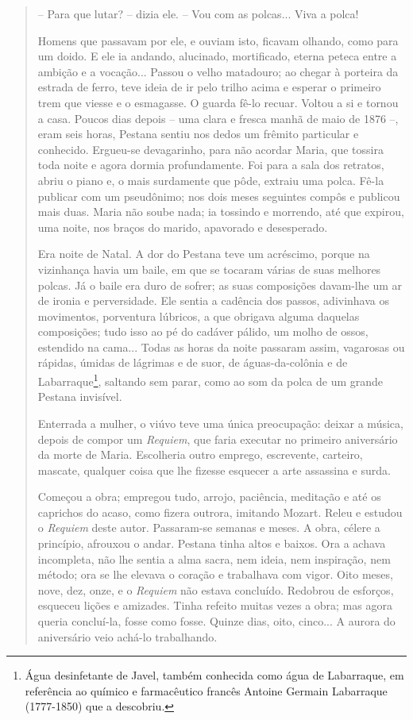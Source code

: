 \begin{quote}
-- Para que lutar? -- dizia ele. -- Vou com as polcas... Viva a polca!

Homens que passavam por ele, e ouviam isto, ficavam olhando, como para
um doido. E ele ia andando, alucinado, mortificado, eterna peteca entre
a ambição e a vocação... Passou o velho matadouro; ao chegar à porteira
da estrada de ferro, teve ideia de ir pelo trilho acima e esperar o
primeiro trem que viesse e o esmagasse. O guarda fê-lo recuar. Voltou a
si e tornou a casa. Poucos dias depois -- uma clara e fresca manhã de
maio de 1876 --, eram seis horas, Pestana sentiu nos dedos um frêmito
particular e conhecido. Ergueu-se devagarinho, para não acordar Maria,
que tossira toda noite e agora dormia profundamente. Foi para a sala dos
retratos, abriu o piano e, o mais surdamente que pôde, extraiu uma
polca. Fê-la publicar com um pseudônimo; nos dois meses seguintes compôs
e publicou mais duas. Maria não soube nada; ia tossindo e morrendo, até
que expirou, uma noite, nos braços do marido, apavorado e desesperado.

Era noite de Natal. A dor do Pestana teve um acréscimo, porque na
vizinhança havia um baile, em que se tocaram várias de suas melhores
polcas. Já o baile era duro de sofrer; as suas composições davam-lhe um
ar de ironia e perversidade. Ele sentia a cadência dos passos,
adivinhava os movimentos, porventura lúbricos, a que obrigava alguma
daquelas composições; tudo isso ao pé do cadáver pálido, um molho de
ossos, estendido na cama... Todas as horas da noite passaram assim,
vagarosas ou rápidas, úmidas de lágrimas e de suor, de águas-da-colônia
e de Labarraque\footnote{Água desinfetante de Javel, também conhecida
  como água de Labarraque, em referência ao químico e farmacêutico
  francês Antoine Germain Labarraque (1777-1850) que a descobriu.},
saltando sem parar, como ao som da polca de um grande Pestana invisível.

Enterrada a mulher, o viúvo teve uma única preocupação: deixar a música,
depois de compor um \emph{Requiem}, que faria executar no primeiro
aniversário da morte de Maria. Escolheria outro emprego, escrevente,
carteiro, mascate, qualquer coisa que lhe fizesse esquecer a arte
assassina e surda.

Começou a obra; empregou tudo, arrojo, paciência, meditação e até os
caprichos do acaso, como fizera outrora, imitando Mozart. Releu e
estudou o \emph{Requiem} deste autor. Passaram-se semanas e meses. A
obra, célere a princípio, afrouxou o andar. Pestana tinha altos e
baixos. Ora a achava incompleta, não lhe sentia a alma sacra, nem ideia,
nem inspiração, nem método; ora se lhe elevava o coração e trabalhava
com vigor. Oito meses, nove, dez, onze, e o \emph{Requiem} não estava
concluído. Redobrou de esforços, esqueceu lições e amizades. Tinha
refeito muitas vezes a obra; mas agora queria concluí-la, fosse como
fosse. Quinze dias, oito, cinco... A aurora do aniversário veio achá-lo
trabalhando.


\end{quote}
